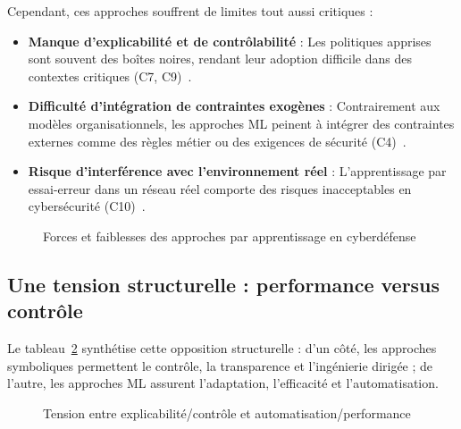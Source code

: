\documentclass[ twoside,openright,titlepage,numbers=noenddot,headinclude,%
                footinclude=true,cleardoublepage=empty,abstractoff, %
                BCOR=5mm,paper=a4,fontsize=11pt,%
                french,american,%
                ]{scrreprt}
\begin{document}
Cependant, ces approches souffrent de limites tout aussi critiques :

\begin{itemize}
    \item \textbf{Manque d'explicabilité et de contrôlabilité} : Les politiques apprises sont souvent des boîtes noires, rendant leur adoption difficile dans des contextes critiques (C7, C9)~\cite{Gunning2019XAI, Albrecht2018autonomous}.
    \item \textbf{Difficulté d'intégration de contraintes exogènes} : Contrairement aux modèles organisationnels, les approches ML peinent à intégrer des contraintes externes comme des règles métier ou des exigences de sécurité (C4)~\cite{Chouldechova2018}.
    \item \textbf{Risque d'interférence avec l'environnement réel} : L'apprentissage par essai-erreur dans un réseau réel comporte des risques inacceptables en cybersécurité (C10)~\cite{Miehling2015}.
\end{itemize}

\begin{figure}[H]
    \centering
    \caption{Forces et faiblesses des approches par apprentissage en cyberdéfense}
    \label{fig:limits_learning}
\end{figure}

\subsection{Une tension structurelle : performance versus contrôle}

Le tableau~\ref{fig:limits_tradeoff} synthétise cette opposition structurelle : d'un côté, les approches symboliques permettent le contrôle, la transparence et l'ingénierie dirigée ; de l'autre, les approches ML assurent l'adaptation, l'efficacité et l'automatisation.

\begin{figure}[H]
    \centering
    \caption{Tension entre explicabilité/contrôle et automatisation/performance}
    \label{fig:limits_tradeoff}
\end{figure}
\end{document}
